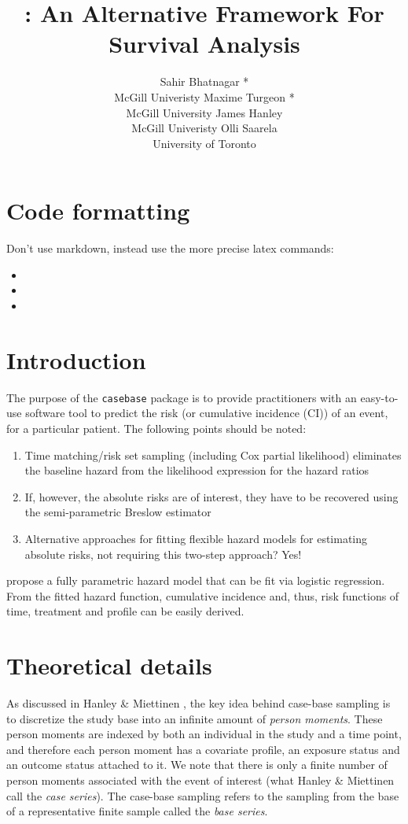 \documentclass[article]{jss}
\author{
Sahir Bhatnagar *\\McGill Univeristy \And Maxime Turgeon *\\McGill University \And James Hanley\\McGill Univeristy \And Olli Saarela\\University of Toronto
}
\title{\pkg{casebase}: An Alternative Framework For Survival Analysis}
\providecommand{\tightlist}{%
  \setlength{\itemsep}{0pt}\setlength{\parskip}{0pt}}
\begin{document}
\section{Code formatting}\label{code-formatting}

Don't use markdown, instead use the more precise latex commands:

\begin{itemize}
\tightlist
\item
\item
\item
\end{itemize}

\section{Introduction}\label{introduction}

The purpose of the \texttt{casebase} package is to provide practitioners
with an easy-to-use software tool to predict the risk (or cumulative
incidence (CI)) of an event, for a particular patient. The following
points should be noted:

\begin{enumerate}
\def\labelenumi{\arabic{enumi}.}
\tightlist
\item
  Time matching/risk set sampling (including Cox partial likelihood)
  eliminates the baseline hazard from the likelihood expression for the
  hazard ratios
\item
  If, however, the absolute risks are of interest, they have to be
  recovered using the semi-parametric Breslow estimator
\item
  Alternative approaches for fitting flexible hazard models for
  estimating absolute risks, not requiring this two-step approach? Yes!
  \citep{hanley2009fitting}
\end{enumerate}

\citep{hanley2009fitting} propose a fully parametric hazard model that
can be fit via logistic regression. From the fitted hazard function,
cumulative incidence and, thus, risk functions of time, treatment and
profile can be easily derived.

\section{Theoretical details}\label{theoretical-details}

As discussed in Hanley \& Miettinen \citeyearpar{hanley2009fitting}, the
key idea behind case-base sampling is to discretize the study base into
an infinite amount of \emph{person moments}. These person moments are
indexed by both an individual in the study and a time point, and
therefore each person moment has a covariate profile, an exposure status
and an outcome status attached to it. We note that there is only a
finite number of person moments associated with the event of interest
(what Hanley \& Miettinen call the \emph{case series}). The case-base
sampling refers to the sampling from the base of a representative finite
sample called the \emph{base series}.
\end{document}
